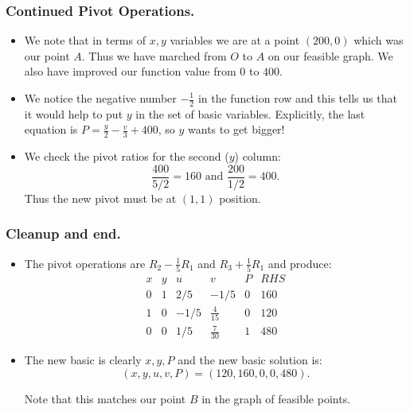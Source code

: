 
\begin{frame}%
 \frametitle{Continued Pivot Operations.}
  \begin{itemize}%
 
\item We note that in terms of $x,y$ variables we are at a point
$(200,0)$ which was our point $A$. Thus we have marched from $O$ to $A$
on our feasible graph. We also have improved our function value from $0$
to $400$.

\item We notice the negative number $-\frac{1}{2}$ in the function row
and this tells us that it would help to put $y$ in the set of basic
variables. Explicitly, the last equation is
$P=\frac{y}{2}-\frac{v}{3}+400$, so $y$ wants to get bigger!

\item We check the pivot ratios for the second ($y$) column:
$$\frac{400}{5/2} = 160 \mbox{ and } \frac{200}{1/2}=400.$$
Thus the new pivot must be at $(1,1)$ position.

\end{itemize}
 
\end{frame}


\begin{frame}%
  \frametitle{Cleanup and end.}
  \begin{itemize}%
\item
The pivot operations are $R_2-\frac{1}{5}R_1$ and $R_3+\frac{1}{5}R_1$
and produce:
$$
\begin {array}{rrrrr|r}
x & y & u & v & P & RHS\\\hline
0&1&2/5&-1/5&0&160\\
1&0&-1/5&{\frac {4}{15}}&0&120\\\hline
0&0&1/5&{\frac {7}{30}}&1&480
\end {array} 
$$

\item The new basic is clearly $x,y,P$ and the new basic solution is:
$$(x,y,u,v,P)=(120,160,0,0,480).$$

Note that this matches our point $B$ in the graph of feasible points.


\end{itemize}
\end{frame}


